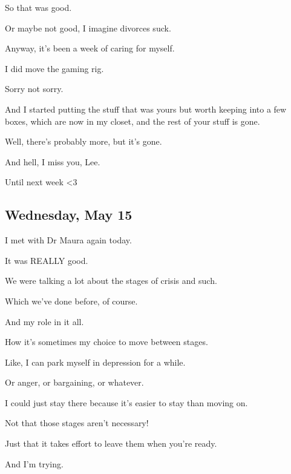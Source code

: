{ So that was good.

 Or maybe not good, I imagine divorces suck.

 Anyway, it's been a week of caring for myself.

 I did move the gaming rig.

 Sorry not sorry.

 And I started putting the stuff that was yours but worth keeping into a few boxes, which are now in my closet, and the rest of your stuff is gone.

 Well, there's probably more, but it's gone.

 And hell, I miss you, Lee.

 Until next week \textless{}3

\newpage

\subsection*{Wednesday, May 15}\label{wednesday-may-15}

 I met with Dr Maura again today.

 It was REALLY good.

 We were talking a lot about the stages of crisis and such.

 Which we've done before, of course.

 And my role in it all.

 How it's sometimes my choice to move between stages.

 Like, I can park myself in depression for a while.

 Or anger, or bargaining, or whatever.

 I could just stay there because it's easier to stay than moving on.

 Not that those stages aren't necessary!

 Just that it takes effort to leave them when you're ready.

 And I'm trying.

}
